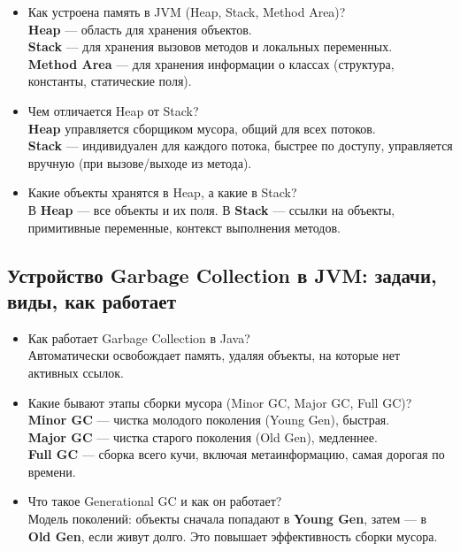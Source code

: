 \documentclass[a4paper,14pt]{article}
\begin{document}
\begin{itemize}
\item Как устроена память в JVM (Heap, Stack, Method Area)? \\
\textbf{Heap} — область для хранения объектов. \\ \textbf{Stack} — для хранения вызовов методов и локальных переменных. \\ \textbf{Method Area} — для хранения информации о классах (структура, константы, статические поля).

\item Чем отличается Heap от Stack? \\
\textbf{Heap} управляется сборщиком мусора, общий для всех потоков. \\ \textbf{Stack} — индивидуален для каждого потока, быстрее по доступу, управляется вручную (при вызове/выходе из метода).

\item Какие объекты хранятся в Heap, а какие в Stack? \\
В \textbf{Heap} — все объекты и их поля. В \textbf{Stack} — ссылки на объекты, примитивные переменные, контекст выполнения методов.
\end{itemize}

\subsection{Устройство Garbage Collection в JVM: задачи, виды, как работает}

\begin{itemize}
\item Как работает Garbage Collection в Java? \\
Автоматически освобождает память, удаляя объекты, на которые нет активных ссылок.

\item Какие бывают этапы сборки мусора (Minor GC, Major GC, Full GC)? \\
\textbf{Minor GC} — чистка молодого поколения (Young Gen), быстрая. \\ \textbf{Major GC} — чистка старого поколения (Old Gen), медленнее. \\ \textbf{Full GC} — сборка всего кучи, включая метаинформацию, самая дорогая по времени.

\item Что такое Generational GC и как он работает? \\
Модель поколений: объекты сначала попадают в \textbf{Young Gen}, затем — в \textbf{Old Gen}, если живут долго. Это повышает эффективность сборки мусора.
\end{itemize}
\end{document}
